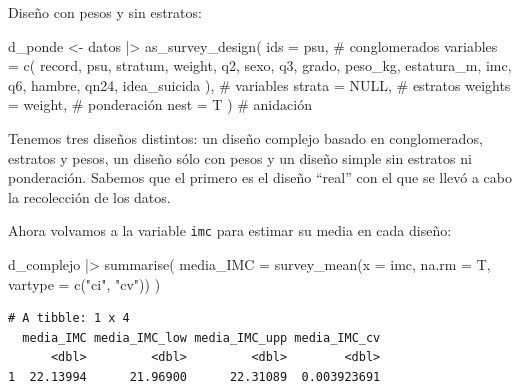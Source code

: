 \documentclass[
  spanish,
  a4paper,
]{scrbook}
\newenvironment{Shaded}{\begin{snugshade}}{\end{snugshade}}
\newcommand{\AttributeTok}[1]{\textcolor[rgb]{0.40,0.45,0.13}{#1}}
\newcommand{\CommentTok}[1]{\textcolor[rgb]{0.37,0.37,0.37}{#1}}
\newcommand{\ConstantTok}[1]{\textcolor[rgb]{0.56,0.35,0.01}{#1}}
\newcommand{\FunctionTok}[1]{\textcolor[rgb]{0.28,0.35,0.67}{#1}}
\newcommand{\NormalTok}[1]{\textcolor[rgb]{0.00,0.23,0.31}{#1}}
\newcommand{\OtherTok}[1]{\textcolor[rgb]{0.00,0.23,0.31}{#1}}
\newcommand{\SpecialCharTok}[1]{\textcolor[rgb]{0.37,0.37,0.37}{#1}}
\newcommand{\StringTok}[1]{\textcolor[rgb]{0.13,0.47,0.30}{#1}}
\begin{document}
Diseño con pesos y sin estratos:

\begin{Shaded}
\begin{Highlighting}[]
\NormalTok{d\_ponde }\OtherTok{\textless{}{-}}\NormalTok{ datos }\SpecialCharTok{|\textgreater{}}
  \FunctionTok{as\_survey\_design}\NormalTok{(}
    \AttributeTok{ids =}\NormalTok{ psu, }\CommentTok{\# conglomerados}
    \AttributeTok{variables =} \FunctionTok{c}\NormalTok{(}
\NormalTok{      record,}
\NormalTok{      psu,}
\NormalTok{      stratum,}
\NormalTok{      weight,}
\NormalTok{      q2,}
\NormalTok{      sexo,}
\NormalTok{      q3,}
\NormalTok{      grado,}
\NormalTok{      peso\_kg,}
\NormalTok{      estatura\_m,}
\NormalTok{      imc,}
\NormalTok{      q6,}
\NormalTok{      hambre,}
\NormalTok{      qn24,}
\NormalTok{      idea\_suicida}
\NormalTok{    ), }\CommentTok{\# variables}
    \AttributeTok{strata =} \ConstantTok{NULL}\NormalTok{, }\CommentTok{\# estratos}
    \AttributeTok{weights =}\NormalTok{ weight, }\CommentTok{\# ponderación}
    \AttributeTok{nest =}\NormalTok{ T}
\NormalTok{  ) }\CommentTok{\# anidación}
\end{Highlighting}
\end{Shaded}

Tenemos tres diseños distintos: un diseño complejo basado en
conglomerados, estratos y pesos, un diseño sólo con pesos y un diseño
simple sin estratos ni ponderación. Sabemos que el primero es el diseño
``real'' con el que se llevó a cabo la recolección de los datos.

Ahora volvamos a la variable \texttt{imc} para estimar su media en cada
diseño:

\begin{Shaded}
\begin{Highlighting}[]
\NormalTok{d\_complejo }\SpecialCharTok{|\textgreater{}}
  \FunctionTok{summarise}\NormalTok{(}
    \AttributeTok{media\_IMC =} \FunctionTok{survey\_mean}\NormalTok{(}\AttributeTok{x =}\NormalTok{ imc, }\AttributeTok{na.rm =}\NormalTok{ T, }\AttributeTok{vartype =} \FunctionTok{c}\NormalTok{(}\StringTok{"ci"}\NormalTok{, }\StringTok{"cv"}\NormalTok{))}
\NormalTok{  )}
\end{Highlighting}
\end{Shaded}

\begin{verbatim}
# A tibble: 1 x 4
  media_IMC media_IMC_low media_IMC_upp media_IMC_cv
      <dbl>         <dbl>         <dbl>        <dbl>
1  22.13994      21.96900      22.31089  0.003923691
\end{verbatim}
\end{document}
